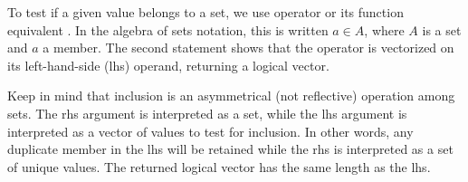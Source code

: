 \documentclass[krantz2]{krantz}\usepackage{knitr}
\begin{document}
\begin{knitrout}\footnotesize
{}\color{fgcolor}\begin{kframe}
\begin{alltt}
 \hlkwb{<-} \hlstd{(}\hlstd{,} \hlstd{,} \hlstd{,} \hlstd{)}
\end{alltt}
\end{kframe}
\end{knitrout}

To test if a given value belongs to a set, we use operator  or its function equivalent . In the algebra of sets notation, this is written $a \in A$, where $A$ is a set and $a$ a member. The second statement shows that the  operator is vectorized on its left-hand-side (lhs) operand, returning a logical vector.

\begin{knitrout}\footnotesize
{}\color{fgcolor}
\end{knitrout}

\begin{explainbox}
Keep in mind that inclusion is an asymmetrical (not reflective) operation among sets. The rhs argument is interpreted as a set, while the lhs argument is interpreted as a vector of values to test for inclusion. In other words, any duplicate member in the lhs will be retained while the rhs is interpreted as a set of unique values. The returned logical vector has the same length as the lhs.
\begin{knitrout}\footnotesize
{}\color{fgcolor}
\end{knitrout}
\end{explainbox}
\end{document}
